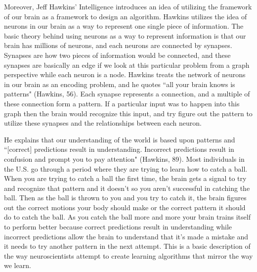 \documentclass[11pt, oneside]{article}
\begin{document}
\par Moreover, Jeff Hawkins' Intelligence introduces an idea of utilizing the framework of our brain as a framework to design an algorithm. Hawkins utilizes the idea of neurons in our brain as a way to represent one single piece of information. The basic theory behind using neurons as a way to represent information is that our brain has millions of neurons, and each neurons are connected by synapses. Synapses are how two pieces of information would be connected, and these synapses are basically an edge if we look at this particular problem from a graph perspective while each neuron is a node. Hawkins treats the network of neurons in our brain as an encoding problem, and he quotes ``all your brain knows is patterns" (Hawkins, 56). Each synapse represents a connection, and a multiple of these connection form a pattern. If a particular input was to happen into this graph then the brain would recognize this input, and try figure out the pattern to utilize these synapses and the relationships between each neuron. 

\par He explains that our understanding of the world is based upon patterns and ``[correct] predictions result in understanding. Incorrect predictions result in confusion and prompt you to pay attention" (Hawkins, 89). Most individuals in the U.S. go through a period where they are trying to learn how to catch a ball. When you are trying to catch a ball the first time, the brain gets a signal to try and recognize that pattern and it doesn't so you aren't successful in catching the ball. Then as the ball is thrown to you and you try to catch it, the brain figures out the correct motions your body should make or the correct pattern it should do to catch the ball. As you catch the ball more and more your brain trains itself to perform better because correct predictions result in understanding while incorrect predictions allow the brain to understand that it's made a mistake and it needs to try another pattern in the next attempt. This is a basic description of the way neuroscientists attempt to create learning algorithms that mirror the way we learn.
\end{document}
